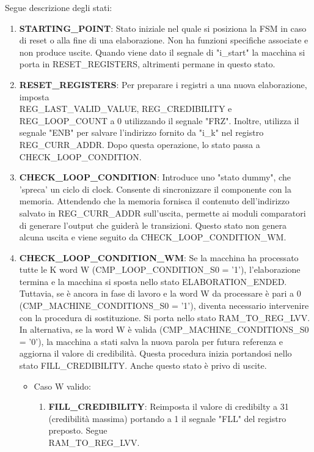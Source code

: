 \documentclass[a4paper]{article}
\begin{document}
Segue descrizione degli stati:
\begin{enumerate}
    \item {\bf STARTING\_POINT}: Stato iniziale nel quale si posiziona la FSM in caso di reset o alla fine di una elaborazione. Non ha funzioni specifiche associate e non produce uscite. Quando viene dato il segnale di "i\_start" la macchina si porta in RESET\_REGISTERS, altrimenti permane in questo stato.
    \item {\bf RESET\_REGISTERS}: Per preparare i registri a una nuova elaborazione, imposta \\ REG\_LAST\_VALID\_VALUE, REG\_CREDIBILITY e REG\_LOOP\_COUNT a 0 utilizzando il segnale "FRZ". Inoltre, utilizza il segnale "ENB" per salvare l'indirizzo fornito da "i\_k" nel registro REG\_CURR\_ADDR. Dopo questa operazione, lo stato passa a CHECK\_LOOP\_CONDITION.
    \item {\bf CHECK\_LOOP\_CONDITION}: Introduce uno "stato dummy", che 'spreca' un ciclo di clock. Consente di sincronizzare il componente con la memoria. Attendendo che la memoria fornisca il contenuto dell'indirizzo salvato in REG\_CURR\_ADDR sull'uscita, permette ai moduli comparatori di generare l'output che guiderà le transizioni. Questo stato non genera alcuna uscita e viene seguito da CHECK\_LOOP\_CONDITION\_WM.
    \item {\bf CHECK\_LOOP\_CONDITION\_WM}: Se la macchina ha processato tutte le K word W (CMP\_LOOP\_CONDITION\_S0 = '1'), l'elaborazione termina e la macchina si sposta nello stato ELABORATION\_ENDED. Tuttavia, se è ancora in fase di lavoro e la word W da processare è pari a 0 (CMP\_MACHINE\_CONDITIONS\_S0 = '1'), diventa necessario intervenire con la procedura di sostituzione. Si porta nello stato RAM\_TO\_REG\_LVV. In alternativa, se la word W è valida (CMP\_MACHINE\_CONDITIONS\_S0 = '0'), la macchina a stati salva la nuova parola per futura referenza e aggiorna il valore di credibilità. Questa procedura inizia portandosi nello stato FILL\_CREDIBILITY. Anche questo stato è privo di uscite.
    \begin{itemize}
        \item Caso W valido:
            \begin{enumerate}
                \item {\bf FILL\_CREDIBILITY}: Reimposta il valore di credibilty a 31 (credibilità massima) portando a 1 il segnale "FLL" del registro preposto. Segue\\RAM\_TO\_REG\_LVV.

\end{enumerate}
\end{itemize}
\end{enumerate}
\end{document}
